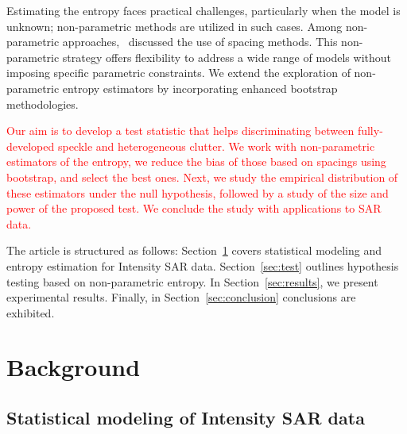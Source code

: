 \documentclass[conference,final,]{IEEEtran}
\begin{document}
Estimating the entropy faces practical challenges, particularly when the
model is unknown; non-parametric methods are utilized in such cases.
Among non-parametric approaches,~\cite{Subhash2021} discussed the use of
spacing methods. This non-parametric strategy offers flexibility to
address a wide range of models without imposing specific parametric
constraints. We extend the exploration of non-parametric entropy
estimators by incorporating enhanced bootstrap methodologies.

\textcolor{red}{Our aim is to develop a test statistic that helps discriminating between fully-developed speckle and heterogeneous clutter.
We work with non-parametric estimators of the entropy, we reduce the bias of those based on spacings using bootstrap, and select the best ones.
Next, we study the empirical distribution of these estimators under the null hypothesis, followed by a study of the size and power of the proposed test.
We conclude the study with applications to SAR data.}

The article is structured as follows: Section~\ref{sec:Background}
covers statistical modeling and entropy estimation for Intensity SAR
data. Section~\ref{sec:test} outlines hypothesis testing based on
non-parametric entropy. In Section~\ref{sec:results}, we present
experimental results. Finally, in Section~\ref{sec:conclusion}
conclusions are exhibited.

\hypertarget{sec:Background}{%
\section{Background}\label{sec:Background}}

\hypertarget{statistical-modeling-of-intensity-sar-data}{%
\subsection{Statistical modeling of Intensity SAR
data}\label{statistical-modeling-of-intensity-sar-data}}
\end{document}
